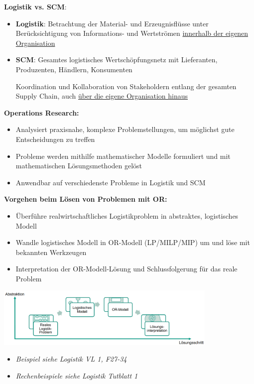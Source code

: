 \textbf{Logistik vs. SCM}:
\begin{itemize}
	\item \textbf{Logistik}: Betrachtung der Material- und Erzeugnisflüsse unter Berücksichtigung von Informations- und Wertströmen \underline{innerhalb der eigenen Organisation}
	\item \textbf{SCM}: Gesamtes logistisches Wertschöpfungsnetz mit Lieferanten, Produzenten, Händlern, Konsumenten 
	
	Koordination und Kollaboration von Stakeholdern entlang der gesamten Supply Chain, auch \underline{über die eigene Organisation hinaus}
\end{itemize}

\textbf{Operations Research:}
\begin{itemize}
	\item Analysiert praxisnahe, komplexe Problemstellungen, um möglichst gute Entscheidungen zu treffen
	\item Probleme werden mithilfe mathematischer Modelle formuliert und mit mathematischen Lösungsmethoden gelöst
	\item Anwendbar auf verschiedenste Probleme in Logistik und SCM
\end{itemize}
\bigskip
\textbf{Vorgehen beim Lösen von Problemen mit OR:}
\begin{itemize}
	\item Überführe realwirtschaftliches Logistikproblem in abstraktes, logistisches Modell
	\item Wandle logistisches Modell in OR-Modell (LP/MILP/MIP) um und löse mit bekannten Werkzeugen
	\item Interpretation der OR-Modell-Lösung und Schlussfolgerung für das reale
	Problem
\end{itemize}
\begin{center}
	\includegraphics[width=0.8\textwidth]{images/or-workflow.png}
\end{center}
\begin{itemize}
	 \item \textit{Beispiel siehe Logistik VL 1, F27-34}
	 \item \textit{Rechenbeispiele siehe Logistik Tutblatt 1}
\end{itemize}
